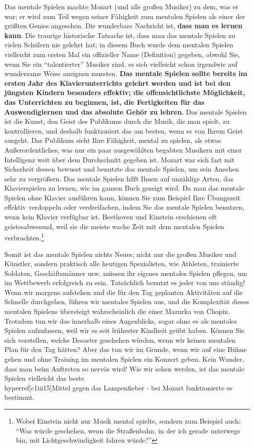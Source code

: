 Das mentale Spielen machte Mozart (und alle großen Musiker) zu dem, was er war; er wird zum Teil wegen seiner Fähigkeit zum mentalen Spielen als einer der größten Genies angesehen.
Die wunderbare Nachricht ist, \textbf{dass man es lernen kann}.
Die traurige historische Tatsache ist, dass man das mentale Spielen zu vielen Schülern nie gelehrt hat;
in diesem Buch wurde dem mentalen Spielen vielleicht zum ersten Mal ein offizieller Name (Definition) gegeben, obwohl Sie, wenn Sie ein \enquote{talentierter} Musiker sind, es sich vielleicht schon irgendwie auf wundersame Weise aneignen mussten.
\textbf{Das mentale Spielen sollte bereits im ersten Jahr des Klavierunterrichts gelehrt werden und ist bei den jüngsten Kindern besonders effektiv;
die offensichtlichste Möglichkeit, das Unterrichten zu beginnen, ist, die Fertigkeiten für das Auswendiglernen und das absolute Gehör zu lehren.}
Das mentale Spielen ist die Kunst, den Geist des Publikums durch die Musik, die man spielt, zu kontrollieren, und deshalb funktioniert das am besten, wenn es von Ihrem Geist ausgeht.
Das Publikum sieht Ihre Fähigkeit, mental zu spielen, als etwas 
Außerordentliches, was nur ein paar ausgewählten begabten Musikern mit einer Intelligenz weit über dem Durchschnitt gegeben ist.
Mozart war sich fast mit Sicherheit dessen bewusst und benutzte das mentale Spielen, um sein Ansehen sehr zu vergrößern.
Das mentale Spielen hilft Ihnen auf unzählige Arten, das Klavierspielen zu lernen, wie im ganzen Buch gezeigt wird.
Da man das mentale Spielen ohne Klavier ausführen kann, können Sie zum Beispiel Ihre Übungszeit effektiv verdoppeln oder verdreifachen, 
indem Sie das mentale Spielen benutzen, wenn kein Klavier verfügbar ist.
Beethoven und Einstein erschienen oft geistesabwesend, weil sie die meiste wache Zeit mit dem mentalen Spielen verbrachten.\footnote{Wobei Einstein nicht nur Musik mental spielte, sondern zum Beispiel auch: \enquote{Was würde geschehen, wenn die Straßenbahn, in der ich gerade unterwegs bin, mit Lichtgeschwindigkeit fahren würde?}}

Somit ist das mentale Spielen nichts Neues;
nicht nur die großen Musiker und Künstler, sondern praktisch alle heutigen Spezialisten, wie Athleten, trainierte Soldaten, Geschäftsmänner usw. müssen ihr eigenes mentales Spielen pflegen, um im Wettbewerb erfolgreich zu sein.
Tatsächlich benutzt es jeder von uns ständig!
Wenn wir morgens aufstehen und die für den Tag geplanten Aktivitäten auf die Schnelle durchgehen, führen wir mentales Spielen aus, und die Komplexität dieses mentalen Spielens übersteigt wahrscheinlich die einer Mazurka von Chopin.
Trotzdem tun wir das innerhalb eines Augenblicks, sogar ohne es als mentales Spielen aufzufassen, weil wir es seit frühester Kindheit geübt haben.
Können Sie sich vorstellen, welche Desaster geschehen würden, wenn wir keinen mentalen Plan für den Tag hätten?
Aber das tun wir im Grunde, wenn wir auf eine Bühne gehen und ohne Training im mentalen Spielen ein Konzert geben.
Kein Wunder, dass man beim Auftreten so nervös wird!
Wie wir sehen werden, ist das mentale Spielen vielleicht das beste \\hyperref[c1iii15]{Mittel gegen das Lampenfieber} - bei Mozart funktionierte es bestimmt.


